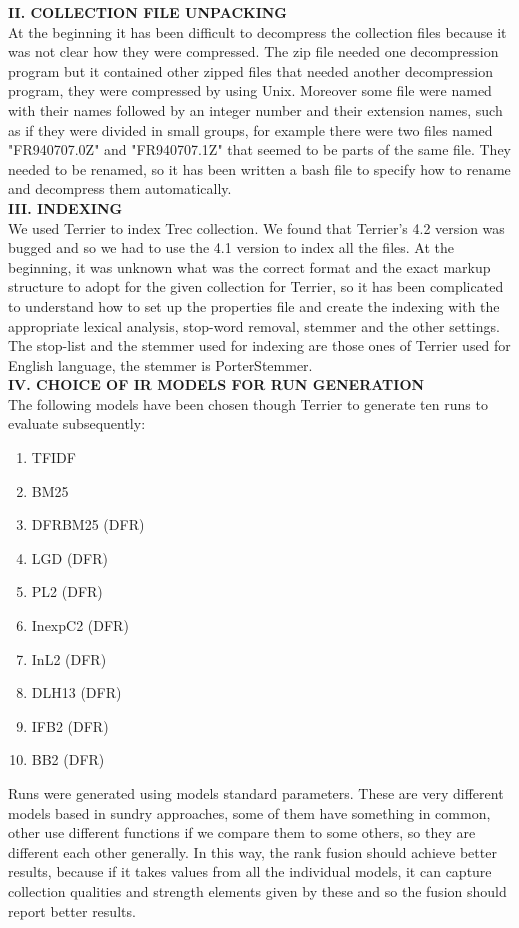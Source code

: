 \documentclass[12pt,journal]{IEEEtran}
\begin{document}
\textbf{II.	COLLECTION FILE UNPACKING} \\
At the beginning it has been difficult to decompress the collection files because it was not clear how they were compressed. The zip file needed one decompression program but it contained other zipped files that needed another decompression program, they were compressed by using Unix. Moreover some file were named with their names followed by an integer number and their extension names, such as if they were divided in small groups, for example there were two files named "FR940707.0Z" and "FR940707.1Z" that seemed to be parts of the same file.
They needed to be renamed, so it has been written a bash file to specify how to rename and decompress them automatically.
 \\

\textbf{III. INDEXING} \\
We used Terrier to index Trec collection. 
We found that Terrier’s 4.2 version was bugged and so we had to use the 4.1 version to index all the files.
At the beginning, it was unknown what was the correct format and the exact markup structure to adopt for the given collection for Terrier, so it has been complicated to understand how to set up the properties file and create the indexing with the appropriate lexical analysis, stop-word removal, stemmer and the other settings. The stop-list and the stemmer used for indexing are those ones of Terrier used for English language, the stemmer is PorterStemmer. \\

\textbf{IV. CHOICE OF IR MODELS FOR RUN GENERATION} \\
The following models have been chosen though Terrier to generate ten runs to evaluate subsequently: 
\begin{enumerate}
\item TFIDF
\item BM25
\item DFRBM25 (DFR)
\item LGD (DFR)
\item PL2 (DFR)
\item InexpC2 (DFR)
\item InL2 (DFR)
\item DLH13 (DFR)
\item IFB2 (DFR)
\item BB2 (DFR)
\end{enumerate}
Runs were generated using models standard parameters.
These are very different models based in sundry approaches, some of them have something in common, other use different functions if we compare them to some others, so they are different each other generally. In this way, the rank fusion should achieve better results, because if it takes values from all the individual models, it can capture collection qualities and strength elements given by these and so the fusion should report better results. \\
\end{document}
